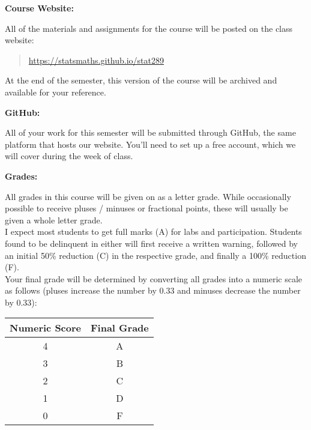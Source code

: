 \documentclass[12pt]{article}
\begin{document}
\vspace{0.4cm}

\textbf{Course Website:} \vspace{6pt}

All of the materials and assignments for the course will be posted
on the class website:
\begin{quote}
\url{https://statsmaths.github.io/stat289}
\end{quote}
At the end of the semester, this version of the course
will be archived and available for your reference.

\newpage

\vspace{0.4cm}

\textbf{GitHub:} \vspace{6pt}

All of your work for this semester will be submitted through GitHub,
the same platform that hosts our website. You'll need to set up a free
account, which we will cover during the week of class.

\vspace{0.4cm}

\textbf{Grades:} \vspace{6pt}

All grades in this course will be given on as a letter grade.
While occasionally possible to receive pluses / minuses or
fractional points, these will usually be given a whole letter grade. \\

I expect most students to get full marks (A) for labs and participation.
Students found to be delinquent in either will first receive a written
warning, followed by an initial 50\% reduction (C) in the respective grade,
and finally a 100\% reduction (F). \\

Your final grade will be determined by converting all grades into
a numeric scale as follows (pluses increase the number by 0.33 and minuses
decrease the number by 0.33):

\begin{center}
\begin{tabular}{c || c}
Numeric Score & Final Grade \\
\hline \hline
4 & A  \\
3 & B  \\
2 & C  \\
1 & D  \\
0 & F
\end{tabular}
\end{center}
\end{document}
